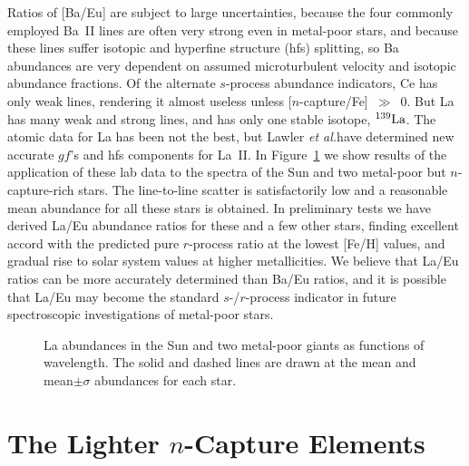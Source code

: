 \documentclass{ws-p8-50x6-00}
\begin{document}
Ratios of [Ba/Eu] are subject to large uncertainties, because the four
commonly employed Ba~II lines are often very strong even in metal-poor stars, 
and because these lines suffer isotopic and hyperfine structure (hfs) 
splitting, so Ba abundances are very dependent on assumed microturbulent 
velocity and isotopic abundance fractions.  
Of the alternate $s$-process abundance indicators, Ce has only weak lines, 
rendering it almost useless unless [$n$-capture/Fe]~$\gg$~0.  
But La has many weak and strong lines, and has only one stable
isotope, $^{139}\rm{La}$.  
The atomic data for La has been not the best, but Lawler 
{\it et al.}\cite{La00}have determined new accurate $gf$'s and hfs 
components for La~II.  
In Figure~\ref{lasummary2} we show results of the application of 
these lab data to the spectra of the Sun and two metal-poor but 
$n$-capture-rich stars.  
The line-to-line scatter is satisfactorily low and a reasonable mean 
abundance for all these stars is obtained.  
In preliminary tests we have derived La/Eu abundance ratios for these 
and a few other stars, finding excellent accord with the predicted pure
$r$-process ratio at the lowest [Fe/H] values, and gradual rise to solar
system values at higher metallicities.  
We believe that La/Eu ratios can be more accurately determined than 
Ba/Eu ratios, and it is possible that La/Eu may become the standard  
$s$-/$r$-process indicator in future spectroscopic investigations 
of metal-poor stars.
 
\begin{figure}[t]
\epsfxsize=20pc \hspace*{0.5in}
 \caption{La abundances in the Sun and two metal-poor giants as functions
of wavelength.
The solid and dashed lines are drawn at the mean and mean$\pm\sigma$
abundances for each star.
\label{lasummary2}}
\end{figure}







\section{The Lighter $n$-Capture Elements}
 
\end{document}

